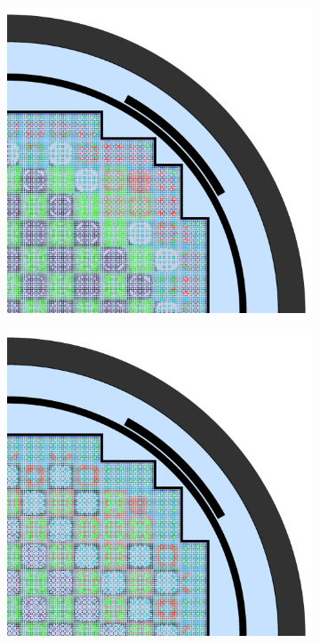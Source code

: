 \begin{figure}[h!]
\begin{subfigure}{0.48\textwidth}
  \caption{}
  \label{fig:chap10-full-core-combined-2}
\end{subfigure}
\begin{subfigure}{0.48\textwidth}
  \centering
  \includegraphics[width=0.9\linewidth]{figures/unsupervised/geometries/with-features/4-clusters/pinch/full-core}
  \caption{}
  \label{fig:chap10-full-core-pinch-4}
\end{subfigure}%
\begin{subfigure}{0.48\textwidth}
  \centering
  \includegraphics[width=0.9\linewidth]{figures/unsupervised/geometries/with-features/4-clusters/combined/full-core}

\end{subfigure}
\end{figure}
